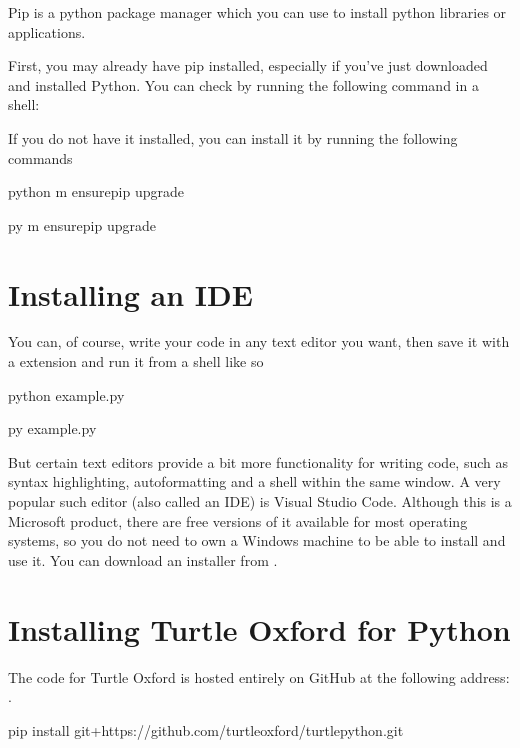 \documentclass[letterpaper,10pt,english]{sphinxmanual}
\begin{document}
\sphinxAtStartPar
Pip is a python package manager which you can use to install python libraries or applications.

\sphinxAtStartPar
First, you may already have pip installed, especially if you’ve just downloaded and installed Python. You can check by running the following command in a shell:

\begin{sphinxVerbatim}[commandchars=\\\{\}]
 
\end{sphinxVerbatim}

\sphinxAtStartPar
If you do not have it installed, you can install it by running the following commands
\begin{description}
\sphinxAtStartPar
python \sphinxhyphen{}m ensurepip \textendash{}upgrade

\sphinxAtStartPar
py \sphinxhyphen{}m ensurepip \textendash{}upgrade

\end{description}


\section{Installing an IDE}
\label{\detokenize{usage:installing-an-ide}}
\sphinxAtStartPar
You can, of course, write your code in any text editor you want, then save it with a  extension and run it from a shell like so
\begin{description}
\sphinxAtStartPar
python example.py

\sphinxAtStartPar
py example.py

\end{description}

\sphinxAtStartPar
But certain text editors provide a bit more functionality for writing code, such as syntax highlighting, auto\sphinxhyphen{}formatting and a shell within the same window.
A very popular such editor (also called an IDE) is Visual Studio Code. Although this is a Microsoft product, there are free versions of it available for most
operating systems, so you do not need to own a Windows machine to be able to install and use it. You can download an installer from .


\section{Installing Turtle Oxford for Python}
\label{\detokenize{usage:installing-turtle-oxford-for-python}}
\sphinxAtStartPar
The code for Turtle Oxford is hosted entirely on GitHub at the following address: .
\begin{description}
\sphinxAtStartPar
pip install git+https://github.com/turtleoxford/turtle\sphinxhyphen{}python.git

\end{description}
\end{document}
